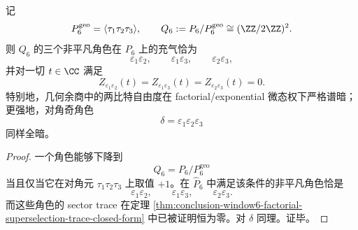 \begin{corollary}[几何余商的谱暗性]\label{cor:conclusion-window6-geometric-quotient-spectral-darkness}
记
\[
P_6^{\mathrm{geo}}=\langle \tau_1\tau_2\tau_3\rangle,
\qquad
Q_6:=P_6/P_6^{\mathrm{geo}}\cong (\ZZ/2\ZZ)^2.
\]
则 \(Q_6\) 的三个非平凡角色在 \(P_6\) 上的充气恰为
\[
\varepsilon_1\varepsilon_2,
\qquad
\varepsilon_1\varepsilon_3,
\qquad
\varepsilon_2\varepsilon_3,
\]
并对一切 \(t\in\CC\) 满足
\[
Z_{\varepsilon_1\varepsilon_2}(t)
=
Z_{\varepsilon_1\varepsilon_3}(t)
=
Z_{\varepsilon_2\varepsilon_3}(t)
=0.
\]
特别地，几何余商中的两比特自由度在 factorial/exponential 微态权下严格谱暗；更强地，对角奇角色
\[
\delta=\varepsilon_1\varepsilon_2\varepsilon_3
\]
同样全暗。
\end{corollary}
\begin{proof}
一个角色能够下降到
\[
Q_6=P_6/P_6^{\mathrm{geo}}
\]
当且仅当它在对角元 \(\tau_1\tau_2\tau_3\) 上取值 \(+1\)。在 \(\widehat P_6\) 中满足该条件的非平凡角色恰是
\[
\varepsilon_1\varepsilon_2,\qquad
\varepsilon_1\varepsilon_3,\qquad
\varepsilon_2\varepsilon_3.
\]
而这些角色的 sector trace 在定理 \ref{thm:conclusion-window6-factorial-superselection-trace-closed-form} 中已被证明恒为零。对 \(\delta\) 同理。证毕。
\end{proof}

